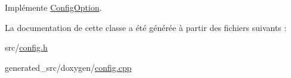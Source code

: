 Implémente \hyperlink{class_config_option_a4af9c041d81cc919e5aae2210087bc38}{Config\+Option}.



La documentation de cette classe a été générée à partir des fichiers suivants \+:\begin{DoxyCompactItemize}
\item 
src/\hyperlink{src_2config_8h}{config.\+h}\item 
generated\+\_\+src/doxygen/\hyperlink{config_8cpp}{config.\+cpp}\end{DoxyCompactItemize}
